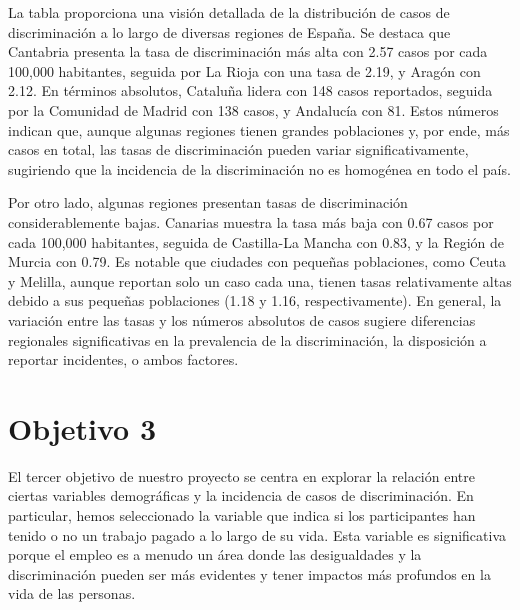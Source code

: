 \documentclass{article}
\begin{document}
La tabla proporciona una visión detallada de la distribución de casos de discriminación a lo largo de diversas regiones de España. Se destaca que Cantabria presenta la tasa de discriminación más alta con 2.57 casos por cada 100,000 habitantes, seguida por La Rioja con una tasa de 2.19, y Aragón con 2.12. En términos absolutos, Cataluña lidera con 148 casos reportados, seguida por la Comunidad de Madrid con 138 casos, y Andalucía con 81. Estos números indican que, aunque algunas regiones tienen grandes poblaciones y, por ende, más casos en total, las tasas de discriminación pueden variar significativamente, sugiriendo que la incidencia de la discriminación no es homogénea en todo el país.

Por otro lado, algunas regiones presentan tasas de discriminación considerablemente bajas. Canarias muestra la tasa más baja con 0.67 casos por cada 100,000 habitantes, seguida de Castilla-La Mancha con 0.83, y la Región de Murcia con 0.79. Es notable que ciudades con pequeñas poblaciones, como Ceuta y Melilla, aunque reportan solo un caso cada una, tienen tasas relativamente altas debido a sus pequeñas poblaciones (1.18 y 1.16, respectivamente). En general, la variación entre las tasas y los números absolutos de casos sugiere diferencias regionales significativas en la prevalencia de la discriminación, la disposición a reportar incidentes, o ambos factores.


\section{Objetivo 3}
El tercer objetivo de nuestro proyecto se centra en explorar la relación entre ciertas variables demográficas y la incidencia de casos de discriminación. En particular, hemos seleccionado la variable que indica si los participantes han tenido o no un trabajo pagado a lo largo de su vida. Esta variable es significativa porque el empleo es a menudo un área donde las desigualdades y la discriminación pueden ser más evidentes y tener impactos más profundos en la vida de las personas.
\end{document}
